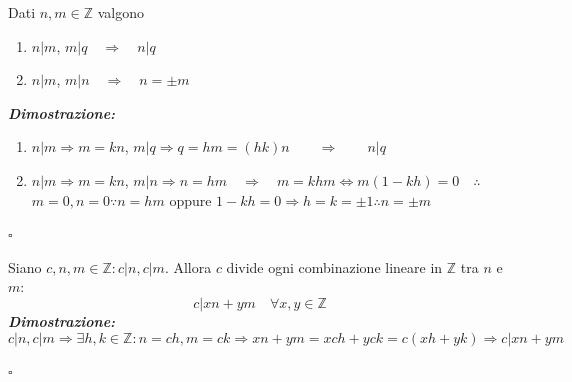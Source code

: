 \documentclass[oneside]{book}
\theoremstyle{remark}
\newcommand{\cvd}{\begin{flushright}$\square$\end{flushright}} %
\begin{document}
\begin{tcolorbox}[title={Proprietà della divisibilità}]
Dati $n,m\in\mathbb{Z}$ valgono
\begin{enumerate}
    \item $n|m$, $m|q \quad \Longrightarrow \quad n|q$
    \item $n|m$, $m|n \quad \Longrightarrow \quad n = \pm m$
\end{enumerate}
\textit{\textbf{Dimostrazione:}}
\begin{enumerate}
    \item $n|m \Rightarrow m = kn$, $m|q \Rightarrow q = hm = (hk)n \qquad \Longrightarrow \qquad n|q$
    \item $n|m \Rightarrow m = kn$, $m|n \Rightarrow n = hm \quad \Longrightarrow \quad m = khm \Longleftrightarrow m(1-kh) = 0 \quad \therefore \quad$ $m = 0, n = 0 \because n = hm$ oppure
    $1 - kh = 0 \Longrightarrow h = k = \pm 1 \therefore n = \pm m$
\end{enumerate}
\cvd
\end{tcolorbox}

\begin{tcolorbox}[colback=violet!30, colframe=violet!30!black, title={Lemma utile}]
Siano $c,n,m\in\mathbb{Z}:c|n,c|m$. Allora $c$ divide ogni combinazione lineare
in $\mathbb{Z}$ tra $n$ e $m$:
\[ c|xn+ym \quad \forall x,y\in\mathbb{Z} \]
\textit{\textbf{Dimostrazione:}} \[c|n,c|m \Longrightarrow \exists
h,k\in\mathbb{Z}:n=ch,m=ck \Longrightarrow xn+ym=xch+yck=c(xh+yk) \Longrightarrow c|xn+ym \]
\cvd
\end{tcolorbox}
\end{document}
